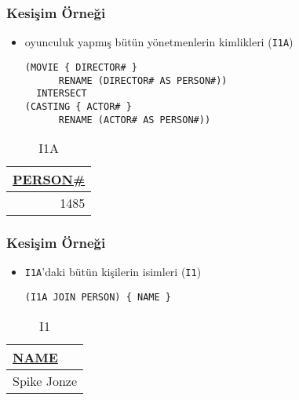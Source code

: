 \documentclass[dvipsnames]{beamer}
\theoremstyle{plain}
\begin{document}
\begin{frame}[fragile]
  \frametitle{Kesişim Örneği}

    \begin{itemize}
      \item oyunculuk yapmış bütün yönetmenlerin kimlikleri (\texttt{I1A})

    \begin{lstlisting}
(MOVIE { DIRECTOR# }
      RENAME (DIRECTOR# AS PERSON#))
  INTERSECT
(CASTING { ACTOR# }
      RENAME (ACTOR# AS PERSON#))
    \end{lstlisting}
    \end{itemize}

    \vspace{-10pt}
    \begin{tiny}
    \begin{table}
      \caption{I1A}
      \begin{tabular}{|r|}\hline
\underline{PERSON\#}\\[2pt]\hline\hline
                1485\\\hline
      \end{tabular}
    \end{table}
    \end{tiny}
\end{frame}

\begin{frame}[fragile]
  \frametitle{Kesişim Örneği}

    \begin{itemize}
      \item \texttt{I1A}'daki bütün kişilerin isimleri (\texttt{I1})

    \begin{lstlisting}
(I1A JOIN PERSON) { NAME }
    \end{lstlisting}
    \end{itemize}

    \vspace{-10pt}
    \begin{tiny}
    \begin{table}
      \caption{I1}
      \begin{tabular}{|l|}\hline
\underline{NAME}\\[2pt]\hline\hline
Spike Jonze     \\\hline
      \end{tabular}
    \end{table}
    \end{tiny}
\end{frame}
\end{document}

